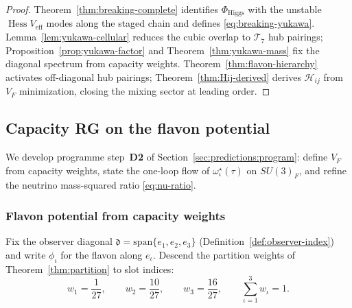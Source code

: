 \documentclass[aps,prd,onecolumn,amsmath,amssymb,nofootinbib,11pt]{revtex4-2}
\numberwithin{equation}{section}
\theoremstyle{plain}
\theoremstyle{definition}
\theoremstyle{remark}
\newcommand{\Hess}{\operatorname{Hess}}
\begin{document}
\begin{proof}
Theorem~\ref{thm:breaking-complete} identifies $\Phi_{\mathrm{Higgs}}$ with
the unstable $\Hess V_{\mathrm{eff}}$ modes along the staged chain and defines
\eqref{eq:breaking-yukawa}. Lemma~\ref{lem:yukawa-cellular} reduces the cubic
overlap to $\mathcal{T}_7$ hub pairings; Proposition~\ref{prop:yukawa-factor}
and Theorem~\ref{thm:yukawa-mass} fix the diagonal spectrum from capacity
weights. Theorem~\ref{thm:flavon-hierarchy} activates off-diagonal hub pairings;
Theorem~\ref{thm:Hij-derived} derives $\mathcal{H}_{ij}$ from $V_F$
minimization, closing the mixing sector at leading order.
\end{proof}%
\subsection{Capacity RG on the flavon potential}
\label{sec:physics:flavon-rg}

We develop programme step~\textbf{D2} of Section~\ref{sec:predictions:program}:
define $V_F$ from capacity weights, state the one-loop flow of
$\omega^\star_\iota(\tau)$ on $SU(3)_F$, and refine the neutrino mass-squared
ratio \eqref{eq:nu-ratio}.

\subsubsection{Flavon potential from capacity weights}

Fix the observer diagonal $\mathfrak{d}=\mathrm{span}\{e_1,e_2,e_3\}$
(Definition~\ref{def:observer-index}) and write $\phi_\iota$ for the flavon
along $e_\iota$. Descend the partition weights of Theorem~\ref{thm:partition} to
slot indices:
\begin{equation}\label{eq:flavon-weights}
  w_1=\frac{1}{27},\qquad w_2=\frac{10}{27},\qquad w_3=\frac{16}{27},
  \qquad \sum_{\iota=1}^3 w_\iota=1.
\end{equation}
\end{document}
